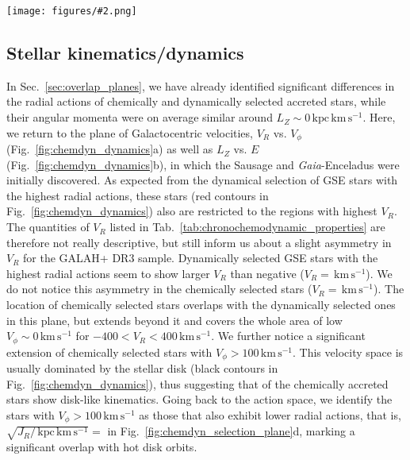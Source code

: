 \documentclass[fleqn,usenatbib]{mnras}
\newcommand{\kms}{\,\mathrm{km\,s^{-1}}}	%
\newcommand{\kpckms}{\,\mathrm{kpc\,km\,s^{-1}}}	%
\newcommand{\Gaia}{\textit{Gaia}\xspace} %
\newcommand{\codeicon}{{\faCloudDownload}}
\newcommand{\codelink}[1]{\href{https://github.com/svenbuder/buder_galah_accreted_chemistry/tree/main/figures/#1.ipynb}{\codeicon}\,\,}
\newcommand{\oscaption}[2]{\caption{#2 \codelink{#1}}}
\newcommand{\figuretextwidth}[4]{\begin{figure*} \centering \texttt{[image: figures/\#2.png]}\oscaption{#3}{#4}\label{fig:#2} \end{figure*}}
\begin{document}
\figuretextwidth{17cm}{chemdyn_dynamics}{chronochemodynamic_comparison}{
\textbf{Comparison of kinematic properties (Galactocentric velocities $V_R$ vs. $V_\phi$) as well as dynamic properties ($L_Z$, $E$, and $e$) for stars selected as accreted ones by means of chemistry (orange) and dynamics (red).} Black contours/lines denote the overall GALAH+ DR3 sample (mainly disk stars).
}

\subsection{Stellar kinematics/dynamics} \label{sec:gse_stellar_dynamics}

In Sec.~\ref{sec:overlap_planes}, we have already identified significant differences in the radial actions of chemically and dynamically selected accreted stars, while their angular momenta were on average similar around $L_Z \sim 0 \kpckms$. Here, we return to the plane of Galactocentric velocities, $V_R$ vs. $V_\phi$ (Fig.~\ref{fig:chemdyn_dynamics}a) as well as $L_Z$ vs. $E$ (Fig.~\ref{fig:chemdyn_dynamics}b), in which the Sausage \citep{Belokurov2018} and \Gaia-Enceladus \citep{Helmi2018} were initially discovered. As expected from the dynamical selection of GSE stars with the highest radial actions, these stars (red contours in Fig.~\ref{fig:chemdyn_dynamics}) also are restricted to the regions with highest $V_R$. The quantities of $V_R$ listed in Tab.~\ref{tab:chronochemodynamic_properties} are therefore not really descriptive, but still inform us about a slight asymmetry in $V_R$ for the GALAH+ DR3 sample. Dynamically selected GSE stars with the highest radial actions seem to show larger $V_R$ than negative ($V_R=$$\kms$). We do not notice this asymmetry in the chemically selected stars ($V_R=$$\kms$). The location of chemically selected stars overlaps with the dynamically selected ones in this plane, but extends beyond it and covers the whole area of low $V_\phi \sim 0 \kms$ for $-400 < V_R < 400\kms$. We further notice a significant extension of  chemically selected stars with $V_\phi > 100 \kms$. This velocity space is usually dominated by the stellar disk (black contours in Fig.~\ref{fig:chemdyn_dynamics}), thus suggesting that  of the chemically accreted stars show disk-like kinematics. Going back to the action space, we identify the stars with $V_\phi > 100 \kms$ as those that also exhibit lower radial actions, that is, $\sqrt{J_R / \kpckms} = $ in Fig.~\ref{fig:chemdyn_selection_plane}d, marking a significant overlap with hot disk orbits.
\end{document}
